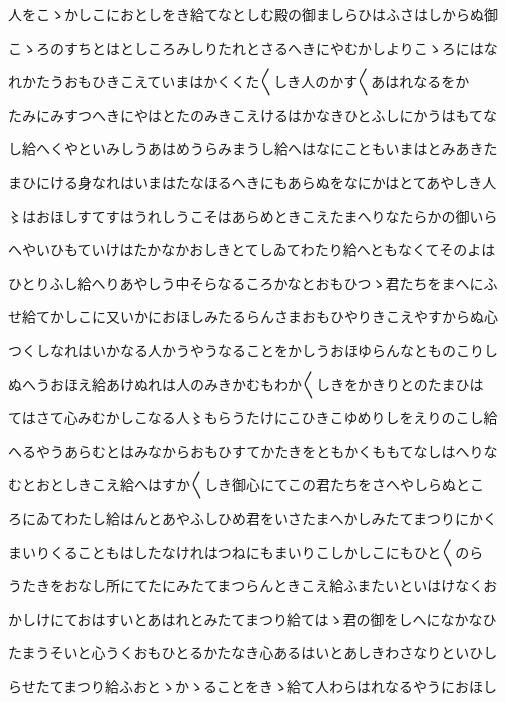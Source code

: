 \documentclass[a4paper,11pt,landscape]{ltjtarticle}
\begin{document}
\par\medskip
人をこゝかしこにおとしをき給てなとしむ殿の御ましらひはふさはしからぬ御
\par\medskip
こゝろのすちとはとしころみしりたれとさるへきにやむかしよりこゝろにはな
\par\medskip
れかたうおもひきこえていまはかくくた〱しき人のかす〱あはれなるをか
\par\medskip
たみにみすつへきにやはとたのみきこえけるはかなきひとふしにかうはもてな
\par\medskip
し給へくやといみしうあはめうらみまうし給へはなにこともいまはとみあきた
\par\medskip
まひにける身なれはいまはたなほるへきにもあらぬをなにかはとてあやしき人
\par\medskip
〻はおほしすてすはうれしうこそはあらめときこえたまへりなたらかの御いら
\par\medskip
へやいひもていけはたかなかおしきとてしゐてわたり給へともなくてそのよは
\par\medskip
ひとりふし給へりあやしう中そらなるころかなとおもひつゝ君たちをまへにふ
\par\medskip
せ給てかしこに又いかにおほしみたるらんさまおもひやりきこえやすからぬ心
\par\medskip
つくしなれはいかなる人かうやうなることをかしうおほゆらんなとものこりし
\par\medskip
ぬへうおほえ給あけぬれは人のみきかむもわか〱しきをかきりとのたまひは
\par\medskip
てはさて心みむかしこなる人〻もらうたけにこひきこゆめりしをえりのこし給
\par\medskip
へるやうあらむとはみなからおもひすてかたきをともかくももてなしはへりな
\par\medskip
むとおとしきこえ給へはすか〱しき御心にてこの君たちをさへやしらぬとこ
\par\medskip
ろにゐてわたし給はんとあやふしひめ君をいさたまへかしみたてまつりにかく
\par\medskip
まいりくることもはしたなけれはつねにもまいりこしかしこにもひと〱のら
\par\medskip
うたきをおなし所にてたにみたてまつらんときこえ給ふまたいといはけなくお
\par\medskip
かしけにておはすいとあはれとみたてまつり給てはゝ君の御をしへになかなひ
\par\medskip
たまうそいと心うくおもひとるかたなき心あるはいとあしきわさなりといひし
\par\medskip
らせたてまつり給ふおとゝかゝることをきゝ給て人わらはれなるやうにおほし
\par\medskip
\end{document}
